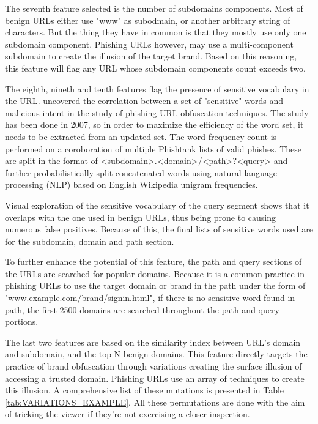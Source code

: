 The seventh feature selected is the number of subdomains components. Most of benign URLs either use "www" as subodmain, or another arbitrary string of characters. But the thing they have in common is that they mostly use only one subdomain component. Phishing URLs however, may use a multi-component subdomain to create the illusion of the target brand. Based on this reasoning, this feature will flag any URL whose subdomain components count exceeds two.

The eighth, nineth and tenth features flag the presence of sensitive vocabulary in the URL. \cite{10.1145/1314389.1314391} uncovered the correlation between a set of "sensitive" words and malicious intent in the study of phishing URL obfuscation techniques. The study has been done in 2007, so in order to maximize the efficiency of the word set, it needs to be extracted from an updated set.
The word frequency count is performed on a coroboration of multiple Phishtank lists of valid phishes. These are split in the format of <subdomain>.<domain>/<path>?<query> and further probabilistically split concatenated words using natural language processing (NLP) based on English Wikipedia unigram frequencies.

Visual exploration of the sensitive vocabulary of the query segment shows that it overlaps with the one used in benign URLs, thus being prone to causing numerous false positives. Because of this, the final lists of sensitive words used are for the subdomain, domain and path section.

To further enhance the potential of this feature, the path and query sections of the URLs are searched for popular domains. Because it is a common practice in phishing URLs to use the target domain or brand in the path under the form of "www.example.com/brand/signin.html", if there is no sensitive word found in path, the first 2500 domains are searched throughout the path and query portions.

The last two features are based on the similarity index between URL's domain and subdomain, and the top N benign domains. This feature directly targets the practice of brand obfuscation through variations creating the surface illusion of accessing a trusted domain.
Phishing URLs use an array of techniques to create this illusion. A comprehensive list of these mutations is presented in Table \ref{tab:VARIATIONS_EXAMPLE}. All these permutations are done with the aim of tricking the viewer if they're not exercising a closer inspection.


